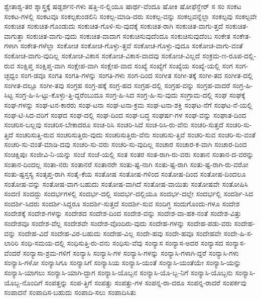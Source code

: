 {ಶ್ವೇತಾಶ್ವ-ತರ
ಶ್ಶಾಸ್ತ್ರಕ್ಕೆ
ಷಡ್ದರ್ಶನ-ಗಳು
ಷತ್ತಿ-ನ-ಲ್ಲಿಯೂ
ಷಾರ್ಥ-ವೆಂದೂ
ಷೋಕಿ
ಷೋಫೆನ್ಹೇರ್
ಸ
ಸಂ
ಸಂಕಟ
ಸಂಕಟ-ಗಳಲ್ಲಿ
ಸಂಕಟವೂ
ಸಂಕಲ್ಪಕುಂಡಲಿನಿ
ಸಂಕಲ್ಪ-ಮಾಡಿ-ದರು
ಸಂಕಲ್ಪ-ವನ್ನು
ಸಂಕಲ್ಪವನ್ನೆಲ್ಲಾ
ಸಂಕಲ್ಪವು
ಸಂಕಲ್ಪವೇ
ಸಂಕುಚಿತ
ಸಂಕುಚಿತ-ಗೊಂಡುದು
ಸಂಕುಚಿತ-ಗೊಳಿ-ಸು-ವುದಕ್ಕೆ
ಸಂಕುಚಿತ-ರಾಗಿ
ಸಂಕುಚಿತ-ವಾಗು-ತ್ತದೆ
ಸಂಕುಚಿತ-ವಾಗುತ್ತಾ
ಸಂಕುಚಿತ-ವಾಗು-ವುದು
ಸಂಕುಚಿತ-ವಾದಾಗ
ಸಂಕುಚಿಸುವುದೆಂದೂ
ಸಂಕುಚಿಸುವುದೆಂಬ
ಸಂಕೇತ
ಸಂಕೇತ-ಗಳಾಗಿ
ಸಂಕೇತ-ಗಳೆಲ್ಲಾ
ಸಂಕೋಚ
ಸಂಕೋಚ-ಗೊಳ್ಳು-ತ್ತವೆ
ಸಂಕೋಚ-ಗೊಳ್ಳು-ವುದೂ
ಸಂಕೋಚ-ವಾಗು-ವಂತೆ
ಸಂಕೋಚ-ವಾಗು-ವುದಿಲ್ಲ
ಸಂಕೋಚ-ವಿಕಾಸ
ಸಂಕೋಚ-ವಿಕಾಸ-ವಾದವು
ಸಂಕೋಚ-ವಿಲ್ಲದೆ
ಸಂಕ್ರಮ-ಣ-ರೂಪ-ದಲ್ಲಿ-ರುವ
ಸಂಕ್ಷಿಪ್ತ
ಸಂಕ್ಷಿಪ್ತ-ವಾಗಿ
ಸಂಕ್ಷೇಪ-ವಾಗಿ
ಸಂಕ್ಷೇಪ-ವಾದ
ಸಂಖ್ಯೆ
ಸಂಖ್ಯೆಗೆ
ಸಂಖ್ಯೆಯ
ಸಂಖ್ಯೆ-ಯಲ್ಲಿ
ಸಂಗ
ಸಂಗ-ಚ್ಛಧ್ವಂ
ಸಂಗ-ಡವೂ
ಸಂಗತಿ
ಸಂಗತಿ-ಗಳನ್ನು
ಸಂಗತಿ-ಗಳು
ಸಂಗ-ದಿಂದ
ಸಂಗೀತ
ಸಂಗೀ-ತಕ್ಕೆ
ಸಂಗೀ-ತದ
ಸಂಗೀತ-ದಲ್ಲಿ
ಸಂಗೀತ-ದಲ್ಲೂ
ಸಂಗೀ-ತವು
ಸಂಗ್ರಹ
ಸಂಗ್ರ-ಹಕ್ಕೆ
ಸಂಗ್ರ-ಹದ
ಸಂಗ್ರಹ-ದಲ್ಲಿ
ಸಂಗ್ರಹ-ವನ್ನು
ಸಂಗ್ರಹ-ವಾದರೆ
ಸಂಗ್ರ-ಹಿ-ಸಿಟ್ಟ
ಸಂಗ್ರ-ಹಿ-ಸಿ-ಟ್ಟು-ಕೊಳ್ಳು-ತ್ತಿ-ದ್ದರೆಂಬುದೂ
ಸಂಗ್ರ-ಹಿ-ಸಿದ
ಸಂಗ್ರ-ಹಿ-ಸು-ವುದು
ಸಂಗ್ರಾಮ-ದಲ್ಲಿ
ಸಂಘ
ಸಂಘಕ್ಕೆ
ಸಂಘ-ಗಳನ್ನು
ಸಂಘ-ಟನ-ಕಾರರು
ಸಂಘ-ಟನಾ
ಸಂಘ-ಟನಾ-ಕ್ರಮ
ಸಂಘ-ಟನಾ-ಶಕ್ತಿ
ಸಂಘಟ-ನೆಗೆ
ಸಂಘಟ-ನೆ-ಯಲ್ಲಿ
ಸಂಘ-ಟಿ-ಸಿದ-ವರಿಗೆ
ಸಂಘದ
ಸಂಘ-ದಲ್ಲಿ
ಸಂಘ-ದಿಂದ
ಸಂಘ-ಬದ್ಧ
ಸಂಘರ್ಷ-ಗಳ
ಸಂಘ-ವನ್ನು
ಸಂಘಾತ-ದಿಂದ
ಸಂಚರಿಸ-ಬಲ್ಲವು
ಸಂಚರಿಸ-ಬೇಕಾದರೂ
ಸಂಚ-ರಿಸಿ
ಸಂಚರಿ-ಸಿದೆ
ಸಂಚ-ರಿಸಿ-ರು-ವೆನು
ಸಂಚರಿ-ಸುತ್ತದೆ
ಸಂಚರಿ-ಸು-ತ್ತಿದೆ
ಸಂಚರಿಸುತ್ತಿ-ರುವ
ಸಂಚರಿಸುತ್ತಿರು-ವುದು
ಸಂಚರಿಸುತ್ತಿರು-ವೆನು
ಸಂಚರಿಸು-ತ್ತಿವೆ
ಸಂಚರಿ-ಸುವ
ಸಂಚರಿ-ಸು-ವಂತೆ
ಸಂಚರಿ-ಸು-ವಂತೆ-ಮಾಡಿ-ದವು
ಸಂಚರಿ-ಸು-ವರು
ಸಂಚರಿ-ಸು-ವುದಿಲ್ಲ
ಸಂಚಾರ
ಸಂಚಾರ-ಕ-ವಾಗಿ
ಸಂಚಾರ-ದಿಂದ
ಸಂಚಿಕ್ಷಿಪುಃ
ಸಂಜೀವಿ-ನಿ-ಯನ್ನು
ಸಂಜೆ
ಸಂಜೆ-ಯಲ್ಲಿ
ಸಂತ
ಸಂತರ
ಸಂತ-ರಾಗಿ-ರು-ವರು
ಸಂತಾನ
ಸಂತಾನ-ದ-ವರನ್ನು
ಸಂತಾನ-ದಿಂದಲ್ಲ
ಸಂತಾ-ನರು
ಸಂತಾನರೆ
ಸಂತಾನರೇ
ಸಂತು-ಷ್ಟ-ನಾಗಿ
ಸಂತು-ಷ್ಟ-ರಾಗಿ
ಸಂತು-ಷ್ಟ-ರಾಗಿ-ರು-ವರೋ
ಸಂತು-ಷ್ಟಸ್ತಸ್ಯ
ಸಂತೃಪ್ತ-ರಾಗಿ
ಸಂತೈ-ಕೆಯ
ಸಂತೋಷ
ಸಂತೋಷ-ಗಳಿಂದ
ಸಂತೋಷ-ದಿಂದ
ಸಂತೋಷ-ದಿಂದಲೂ
ಸಂತೋಷ-ವನ್ನು
ಸಂತೋಷ-ವಾಗ-ಬಹುದು
ಸಂತೋಷ-ವಾಗಿದೆ
ಸಂತೋಷ-ವಾಯಿತು
ಸಂತೋಷವೇ
ಸಂತೋಷಿಸಿ
ಸಂದಣಿ
ಸಂದದ್ದು
ಸಂದರ್ಭಗಳಲ್ಲಿ
ಸಂದರ್ಭ-ದಲ್ಲಿ
ಸಂದರ್ಭ-ದಲ್ಲಿಯೂ
ಸಂದರ್ಭ-ದಲ್ಲೇ
ಸಂದರ್ಭಲ್ಲಿ
ಸಂದರ್ಶಿ-ಸಿದ
ಸಂದರ್ಶಿ-ಸಿದರು
ಸಂದರ್ಶಿ-ಸಿದ್ದರೂ
ಸಂದರ್ಶಿ-ಸುತ್ತದೆ
ಸಂದರ್ಶಿ-ಸುವ
ಸಂದಿಗ್ಧ
ಸಂದುಗೊಂದು-ಗಳೂ
ಸಂದೇಶ
ಸಂದೇಶಕ್ಕೆ
ಸಂದೇಶ-ಗಳನ್ನು
ಸಂದೇಶದ
ಸಂದೇಶ-ದಿಂದ
ಸಂದೇಶ-ವನ್ನು
ಸಂದೇಶ-ವಾ-ಹಕ-ನಂತೆ
ಸಂದೇಶ-ವಿತ್ತು
ಸಂದೇಶವೂ
ಸಂದೇಶ-ವೆಲ್ಲ
ಸಂದೇಶವೇ
ಸಂದೇಶ-ವೊಂದಿರು-ವುದು
ಸಂದೇಹ-ಗಳನ್ನು
ಸಂದೇಹ-ಪಡು-ವರು
ಸಂದೇಹ-ವನ್ನು
ಸಂದೇಹ-ವಿದೆ
ಸಂದೇಹ-ವಿರ-ಬಹುದು
ಸಂದೇಹ-ವಿಲ್ಲ
ಸಂದೇ-ಹವು
ಸಂದೇ-ಹವೂ
ಸಂದೇಹವೇ
ಸಂದೇ-ಹಿ-ಸ-ಲಾರಿರಿ
ಸಂಧಿ-ಸಮಯ-ದಲ್ಲಿ
ಸಂಧಿಸುತ್ತಿ-ರು-ವನು
ಸಂಧಿಸು-ವೆವು
ಸಂನ್ಯಾಸ
ಸಂನ್ಯಾಸ-ಅದರ
ಸಂನ್ಯಾಸದ
ಸಂನ್ಯಾಸ-ವೆಂದರೆ
ಸಂನ್ಯಾಸಾ-ಶ್ರಮ-ಗಳಿಗೆ
ಸಂನ್ಯಾಸಿ
ಸಂನ್ಯಾಸಿ-ಗಳ
ಸಂನ್ಯಾಸಿ-ಗಳನ್ನು
ಸಂನ್ಯಾಸಿ-ಗಳಾಗಿ-ದ್ದರೆ
ಸಂನ್ಯಾಸಿ-ಗಳು
ಸಂನ್ಯಾಸಿ-ಗಳೋ
ಸಂನ್ಯಾಸಿಗೂ
ಸಂನ್ಯಾಸಿಗೆ
ಸಂನ್ಯಾಸಿಯ
ಸಂನ್ಯಾಸಿ-ಯಂತೆ
ಸಂನ್ಯಾಸಿ-ಯಂತೆಯೇ
ಸಂನ್ಯಾಸಿ-ಯನ್ನು
ಸಂನ್ಯಾಸಿ-ಯಾಗಲು
ಸಂನ್ಯಾಸಿ-ಯಾಗಿ-ದ್ದಾಗ
ಸಂನ್ಯಾಸಿ-ಯೊಬ್ಬನ
ಸಂನ್ಯಾಸಿ-ಯೊ-ಬ್ಬ-ನಿಗೆ
ಸಂನ್ಯಾಸಿ-ಯೊಬ್ಬನು
ಸಂನ್ಯಾಸಿ-ಯೊಬ್ಬ-ನೊಂದಿಗೆ
ಸಂಪತ್ತನ್ನು
ಸಂಪ-ತ್ತಿಗೆ
ಸಂಪತ್ತು
ಸಂಪತ್ತು-ಗಳ
ಸಂಪನ್ನ-ರಾ-ದರೂ
ಸಂಪನ್ನ-ರಾದರೆ
ಸಂಪರ್ಕವು
ಸಂಪಾದನೆ
ಸಂಪಾದಿಸ-ಬಹುದು
ಸಂಪಾದಿ-ಸಲು
ಸಂಪಾದಿಸಿತು
}
